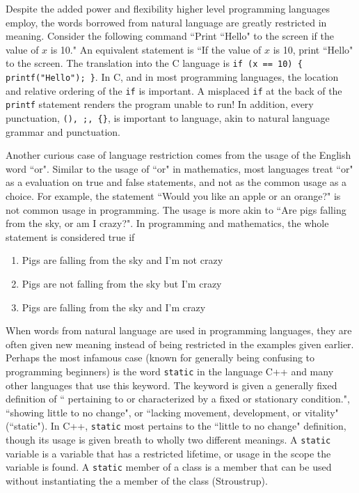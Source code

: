 \documentclass[12pt]{article}
\begin{document}
\begin{flushleft}
Despite the added power and flexibility higher level programming languages employ,
the words borrowed from natural language are greatly restricted in meaning. Consider
the following command ``Print ``Hello" to the screen if the value of $x$ is
10." An equivalent statement is ``If the value of $x$ is 10, print ``Hello"
to the screen.
The translation into the C language is \verb|if (x == 10) { printf("Hello"); }|.
In C, and in most programming languages, the location and relative ordering
of the \verb|if| is important. A misplaced \verb|if| at the back of the
\verb|printf| statement renders the program unable to run! In addition, every
punctuation, \verb|(), ;, {}|, is important to language, akin to natural
language grammar and punctuation.

Another curious case of language restriction comes from the usage of the English
word ``or". Similar to the usage of ``or" in mathematics, most languages
treat ``or" as a evaluation on true and false statements, and not as the
common usage as a choice. For example, the statement ``Would you like an
apple or an orange?" is not common usage in programming. The usage is more
akin to ``Are pigs falling from the sky, or am I crazy?".
In programming and mathematics, the whole statement is considered true
if \footnotemark \begin{enumerate}
    \item Pigs are falling from the sky and I'm not crazy
    \item Pigs are not falling from the sky but I'm crazy
    \item Pigs are falling from the sky and I'm crazy
\end{enumerate}

When words from natural language are used in programming languages, they
are often given new meaning instead of being restricted in the examples
given earlier. Perhaps the most infamous case (known for generally being
confusing to programming beginners) is the word \verb|static| in the
language C++ and many other languages that use this keyword. The keyword
is given a generally fixed definition of ``
pertaining to or characterized by a fixed or stationary condition.",
``showing little to no change",
or ``lacking movement, development, or vitality" (``static").
In C++, \verb|static| most pertains to the ``little to no change" definition,
though its usage is given breath to wholly two different meanings.
A \verb|static| variable is a variable that has a restricted lifetime, or
usage in the scope the variable is found. A \verb|static| member of a
class is a member that can be used without instantiating the a member of
the class (Stroustrup).


\end{flushleft}
\end{document}
